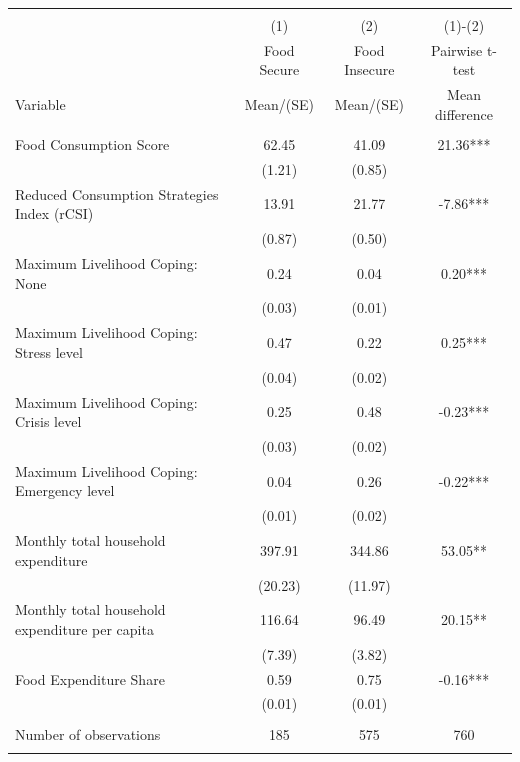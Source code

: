 
\begin{tabular}{@{\extracolsep{5pt}}lccc}
\\[-1.8ex]\hline \hline \\[-1.8ex]
 & \multicolumn{1}{c}{(1)}  & \multicolumn{1}{c}{(2)}  & \multicolumn{1}{c}{(1)-(2)} \\
 & \multicolumn{1}{c}{Food Secure}  & \multicolumn{1}{c}{Food Insecure}  & \multicolumn{1}{c}{Pairwise t-test}  \\
Variable & Mean/(SE) & Mean/(SE) & Mean difference \\ \hline \\[-1.8ex] 
Food Consumption Score   & 62.45    & 41.09    & 21.36***   \\
 & (1.21)  & (0.85)  &  \\ [1ex]
Reduced Consumption Strategies Index (rCSI)   & 13.91    & 21.77    & -7.86***   \\
 & (0.87)  & (0.50)  &  \\ [1ex]
Maximum Livelihood Coping: None   & 0.24    & 0.04    & 0.20***   \\
 & (0.03)  & (0.01)  &  \\ [1ex]
Maximum Livelihood Coping: Stress level   & 0.47    & 0.22    & 0.25***   \\
 & (0.04)  & (0.02)  &  \\ [1ex]
Maximum Livelihood Coping: Crisis level   & 0.25    & 0.48    & -0.23***   \\
 & (0.03)  & (0.02)  &  \\ [1ex]
Maximum Livelihood Coping: Emergency level   & 0.04    & 0.26    & -0.22***   \\
 & (0.01)  & (0.02)  &  \\ [1ex]
Monthly total household expenditure   & 397.91    & 344.86    & 53.05**   \\
 & (20.23)  & (11.97)  &  \\ [1ex]
Monthly total household expenditure per capita   & 116.64    & 96.49    & 20.15**   \\
 & (7.39)  & (3.82)  &  \\ [1ex]
Food Expenditure Share   & 0.59    & 0.75    & -0.16***   \\
 & (0.01)  & (0.01)  &  \\ [1ex]
\hline \\[-1.8ex]
Number of observations  & 185   & 575  & 760  \\
\hline \hline \\[-1.8ex]

\end{tabular}
